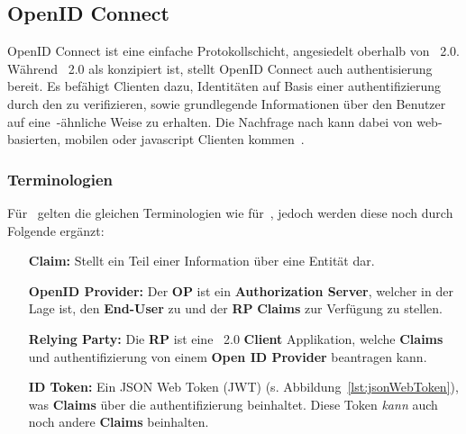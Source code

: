 \subsection{OpenID Connect}\label{subsec:openid-connect}
	OpenID Connect ist eine einfache Protokollschicht,
	angesiedelt oberhalb von~ 2.0.
	Während~ 2.0 als  konzipiert ist,
	stellt OpenID Connect auch \gls{authentisierung} bereit.
	Es befähigt Clienten dazu,
	Identitäten auf Basis einer \gls{authentifizierung} durch den
	 zu verifizieren,
	sowie grundlegende Informationen über den Benutzer auf eine~-ähnliche Weise zu erhalten.
	Die Nachfrage nach  kann dabei von web-basierten,
	mobilen oder \gls{javascript} Clienten kommen~\cite[Vgl.][]{oidc}.

	\subsubsection{Terminologien}
		Für~ gelten die gleichen Terminologien wie für~,
		jedoch werden diese noch durch Folgende ergänzt:

		\begin{itemize}
			\item[\textbf{Claim:}] Stellt ein Teil einer Information über eine Entität dar.

			\item[\textbf{OpenID Provider:}] Der \textbf{OP} ist ein \textbf{Authorization Server},
			welcher in der Lage ist,
			den \textbf{End-User} zu 
			und der \textbf{RP} \textbf{Claims} zur Verfügung zu stellen.

			\item[\textbf{Relying Party:}] Die \textbf{RP} ist eine~ 2.0 \textbf{Client} Applikation,
			welche \textbf{Claims} und \gls{authentifizierung} von einem \textbf{Open ID Provider} beantragen kann.

			\item[\textbf{ID Token:}] Ein JSON Web Token (JWT) (s. Abbildung~\ref{lst:jsonWebToken}), was \textbf{Claims}
			über die \gls{authentifizierung} beinhaltet.
			Diese Token \textit{kann} auch noch andere \textbf{Claims} beinhalten.

		\end{itemize}

